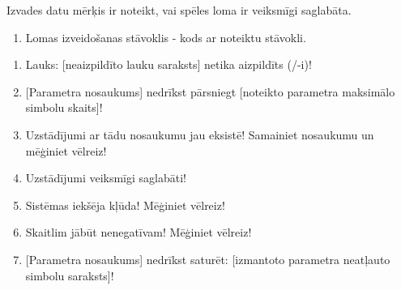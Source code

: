 {
	Izvades datu mērķis ir noteikt, vai spēles loma ir veiksmīgi saglabāta.
	\begin{enumerate}
		\item Lomas izveidošanas stāvoklis - kods ar noteiktu stāvokli.
	\end{enumerate}
}
{
	\begin{enumerate}
		\item Lauks: [neaizpildīto lauku saraksts] netika aizpildīts (/-i)!
		\item {}[Parametra nosaukums] nedrīkst pārsniegt [noteikto parametra maksimālo simbolu skaits]!
		\item Uzstādījumi ar tādu nosaukumu jau eksistē! Samainiet nosaukumu un mēģiniet vēlreiz!
		\item Uzstādījumi veiksmīgi saglabāti!
		\item Sistēmas iekšēja kļūda! Mēģiniet vēlreiz!
		\item Skaitlim jābūt nenegatīvam! Mēģiniet vēlreiz!
		\item {}[Parametra nosaukums] nedrīkst saturēt: [izmantoto parametra neatļauto simbolu saraksts]!
	\end{enumerate}
}
